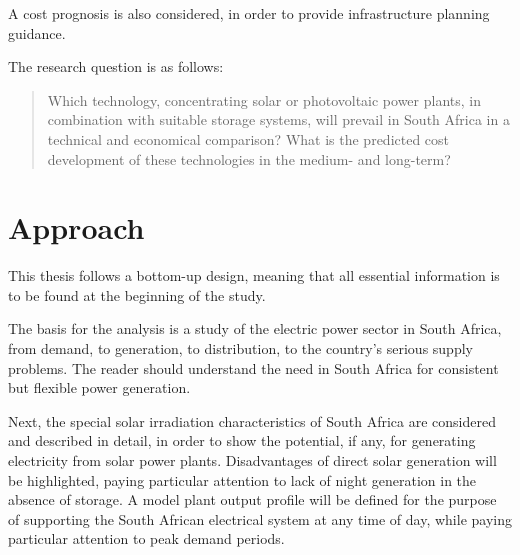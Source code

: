 A cost prognosis is also considered, in order to provide infrastructure planning guidance.

The research question is as follows:
\begin{quote}
Which technology, concentrating solar or photovoltaic power plants, in combination with suitable storage systems, will prevail in South Africa in a technical and economical comparison? What is the predicted cost development of these technologies in the medium- and long-term?
\end{quote}


\section{Approach}

This thesis follows a bottom-up design, meaning that all essential information is to be found at the beginning of the study.


The basis for the analysis is a study of the electric power sector in South Africa, from demand, to generation, to distribution, to the country's serious supply problems. The reader should understand the need in South Africa for consistent but flexible power generation.


Next, the special solar irradiation characteristics of South Africa are considered and described in detail, in order to show the potential, if any, for generating electricity from solar power plants. Disadvantages of direct solar generation will be highlighted, paying particular attention to lack of night generation in the absence of storage. A model plant output profile will be defined for the purpose of supporting the South African electrical system at any time of day, while paying particular attention to peak demand periods.

